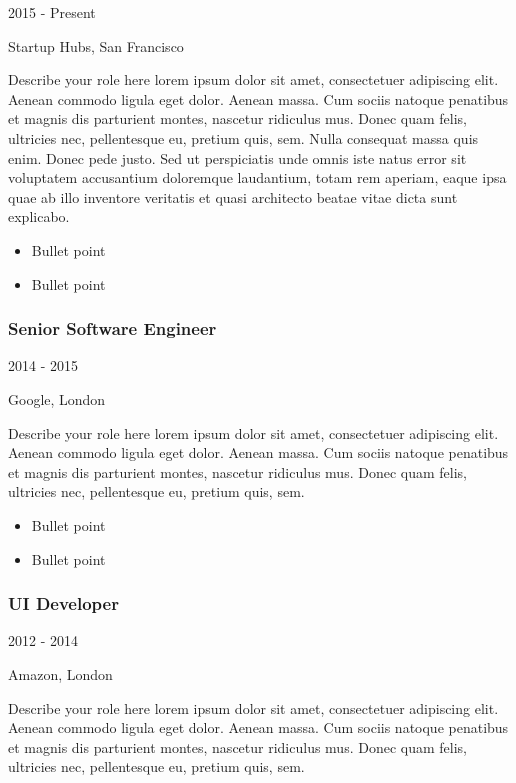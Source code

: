 \documentclass[english,]{article}
\providecommand{\tightlist}{%
  \setlength{\itemsep}{0pt}\setlength{\parskip}{0pt}}
\begin{document}
2015 - Present

Startup Hubs, San Francisco

Describe your role here lorem ipsum dolor sit amet, consectetuer
adipiscing elit. Aenean commodo ligula eget dolor. Aenean massa. Cum
sociis natoque penatibus et magnis dis parturient montes, nascetur
ridiculus mus. Donec quam felis, ultricies nec, pellentesque eu, pretium
quis, sem. Nulla consequat massa quis enim. Donec pede justo. Sed ut
perspiciatis unde omnis iste natus error sit voluptatem accusantium
doloremque laudantium, totam rem aperiam, eaque ipsa quae ab illo
inventore veritatis et quasi architecto beatae vitae dicta sunt
explicabo.

\begin{itemize}
\tightlist
\item
  Bullet point
\item
  Bullet point
\end{itemize}

\hypertarget{senior-software-engineer}{%
\subsubsection{Senior Software
Engineer}\label{senior-software-engineer}}

2014 - 2015

Google, London

Describe your role here lorem ipsum dolor sit amet, consectetuer
adipiscing elit. Aenean commodo ligula eget dolor. Aenean massa. Cum
sociis natoque penatibus et magnis dis parturient montes, nascetur
ridiculus mus. Donec quam felis, ultricies nec, pellentesque eu, pretium
quis, sem.

\begin{itemize}
\tightlist
\item
  Bullet point
\item
  Bullet point
\end{itemize}

\hypertarget{ui-developer}{%
\subsubsection{UI Developer}\label{ui-developer}}

2012 - 2014

Amazon, London

Describe your role here lorem ipsum dolor sit amet, consectetuer
adipiscing elit. Aenean commodo ligula eget dolor. Aenean massa. Cum
sociis natoque penatibus et magnis dis parturient montes, nascetur
ridiculus mus. Donec quam felis, ultricies nec, pellentesque eu, pretium
quis, sem.
\end{document}
